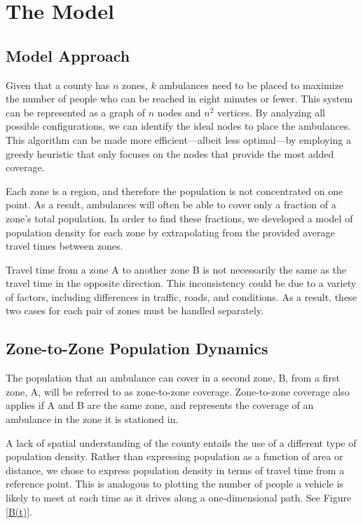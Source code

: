 \documentclass[notitlepage, 12pt]{article}
\begin{document}
\section{The Model}

\subsection{Model Approach}

Given that a county has $n$ zones, $k$ ambulances need to be placed to maximize the number of people who can be reached in eight minutes or fewer. This system can be represented as a graph of $n$ nodes and $n^2$ vertices. By analyzing all possible configurations, we can identify the ideal nodes to place the ambulances. This algorithm can be made more efficient---albeit less optimal---by employing a greedy heuristic that only focuses on the nodes that provide the most added coverage.

Each zone is a region, and therefore the population is not concentrated on one point. As a result, ambulances will often be able to cover only a fraction of a zone's total population. In order to find these fractions, we developed a model of population density for each zone by extrapolating from the provided average travel times between zones.

Travel time from a zone A to another zone B is not necessarily the same as the travel time in the opposite direction. This inconsistency could be due to a variety of factors, including differences in traffic, roads, and conditions. As a result, these two cases for each pair of zones must be handled separately.

\subsection{Zone-to-Zone Population Dynamics}
The population that an ambulance can cover in a second zone, B, from a first zone, A, will be referred to as zone-to-zone coverage. Zone-to-zone coverage also applies if A and B are the same zone, and represents the coverage of an ambulance in the zone it is stationed in.

A lack of spatial understanding of the county entails the use of a different type of population density. Rather than expressing population as a function of area or distance, we chose to express population density in terms of travel time from a reference point. This is analogous to plotting the number of people a vehicle is likely to meet at each time as it drives along a one-dimensional path. See Figure \ref{B(t)}.
\end{document}
